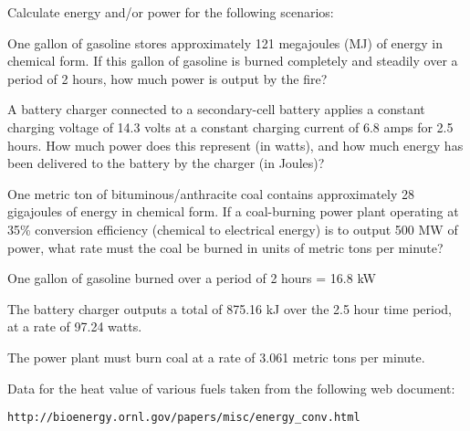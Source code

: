 

\noindent
Calculate energy and/or power for the following scenarios:

\vskip 10pt {\narrower \noindent \baselineskip5pt

\noindent
One gallon of gasoline stores approximately 121 megajoules (MJ) of energy in chemical form.  If this gallon of gasoline is burned completely and steadily over a period of 2 hours, how much power is output by the fire?

\par} \vskip 10pt



\vskip 10pt {\narrower \noindent \baselineskip5pt

\noindent
A battery charger connected to a secondary-cell battery applies a constant charging voltage of 14.3 volts at a constant charging current of 6.8 amps for 2.5 hours.  How much power does this represent (in watts), and how much energy has been delivered to the battery by the charger (in Joules)?

\par} \vskip 10pt


\vskip 10pt {\narrower \noindent \baselineskip5pt

\noindent
One metric ton of bituminous/anthracite coal contains approximately 28 gigajoules of energy in chemical form.  If a coal-burning power plant operating at 35\% conversion efficiency (chemical to electrical energy) is to output 500 MW of power, what rate must the coal be burned in units of metric tons per minute?

\par} \vskip 10pt









One gallon of gasoline burned over a period of 2 hours = 16.8 kW

\vskip 10pt

The battery charger outputs a total of 875.16 kJ over the 2.5 hour time period, at a rate of 97.24 watts.

\vskip 10pt

The power plant must burn coal at a rate of 3.061 metric tons per minute.

\vskip 10pt

Data for the heat value of various fuels taken from the following web document:

{\tt http://bioenergy.ornl.gov/papers/misc/energy\_conv.html}











